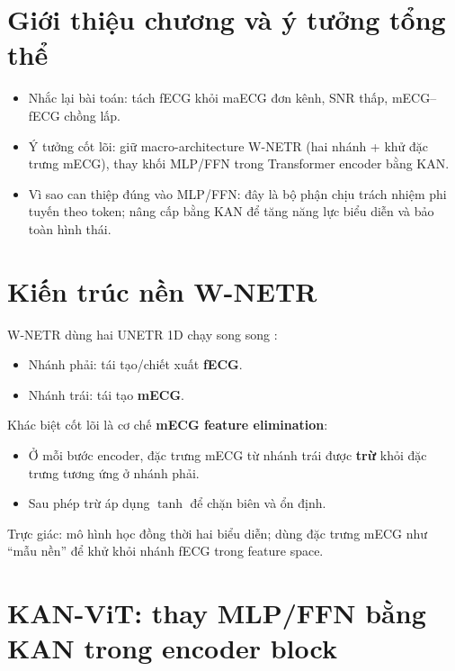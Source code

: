 \documentclass[../DoAn.tex]{subfiles}
\begin{document}

\section{Giới thiệu chương và ý tưởng tổng thể}
\begin{itemize}
  \item Nhắc lại bài toán: tách fECG khỏi maECG đơn kênh, SNR thấp, mECG--fECG chồng lấp.
  \item Ý tưởng cốt lõi: giữ macro-architecture W-NETR (hai nhánh + khử đặc trưng mECG), thay khối MLP/FFN trong Transformer encoder bằng KAN.
  \item Vì sao can thiệp đúng vào MLP/FFN: đây là bộ phận chịu trách nhiệm phi tuyến theo token; nâng cấp bằng KAN để tăng năng lực biểu diễn và bảo toàn hình thái.
\end{itemize}

\section{Kiến trúc nền W-NETR}

W-NETR dùng hai UNETR 1D chạy song song \cite{leeEndtoEndDeepLearning2022}:
\begin{itemize}
  \item Nhánh phải: tái tạo/chiết xuất \textbf{fECG}.
  \item Nhánh trái: tái tạo \textbf{mECG}.
\end{itemize}
Khác biệt cốt lõi là cơ chế \textbf{mECG feature elimination}:
\begin{itemize}
  \item Ở mỗi bước encoder, đặc trưng mECG từ nhánh trái được \textbf{trừ} khỏi đặc trưng tương ứng ở nhánh phải.
  \item Sau phép trừ áp dụng $\tanh$ để chặn biên và ổn định.
\end{itemize}
Trực giác: mô hình học đồng thời hai biểu diễn; dùng đặc trưng mECG như ``mẫu nền'' để khử khỏi nhánh fECG trong feature space.

\section{KAN-ViT: thay MLP/FFN bằng KAN trong encoder block}
\end{document}

